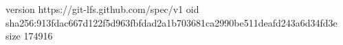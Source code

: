 version https://git-lfs.github.com/spec/v1
oid sha256:913fdac667d122f5d963fbfdad2a1b703681ca2990be511deafd243a6d34fd3e
size 174916
